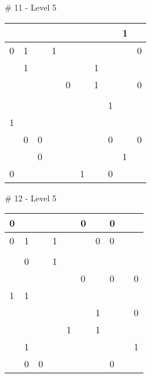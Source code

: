 \medskip

\# 11 - Level 5 \newline
\begin{tabular}{|m{\collen}|m{\collen}|m{\collen}|m{\collen}|m{\collen}|m{\collen}|m{\collen}|m{\collen}|m{\collen}|m{\collen}|}
\hline
    &   &   &   &   &   &   &   & 1 &   \\
\hline
  0 & 1 &   & 1 &   &   &   &   &   & 0 \\
\hline
    & 1 &   &   &   &   & 1 &   &   &   \\
\hline
    &   &   &   & 0 &   & 1 &   &   & 0 \\
\hline
    &   &   &   &   &   &   &   &   &   \\
\hline
    &   &   &   &   &   &   & 1 &   &   \\
\hline
  1 &   &   &   &   &   &   &   &   &   \\
\hline
    & 0 & 0 &   &   &   &   & 0 &   & 0 \\
\hline
    &   & 0 &   &   &   &   &   & 1 &   \\
\hline
  0 &   &   &   &   & 1 &   & 0 &   &   \\
\hline
\end{tabular}


\medskip

\# 12 - Level 5 \newline
\begin{tabular}{|m{\collen}|m{\collen}|m{\collen}|m{\collen}|m{\collen}|m{\collen}|m{\collen}|m{\collen}|m{\collen}|m{\collen}|}
\hline
  0 &   &   &   &   & 0 &   & 0 &   &   \\
\hline
  0 & 1 &   & 1 &   &   & 0 & 0 &   &   \\
\hline
    &   &   &   &   &   &   &   &   &   \\
\hline
    & 0 &   & 1 &   &   &   &   &   &   \\
\hline
    &   &   &   &   & 0 &   & 0 &   & 0 \\
\hline
  1 & 1 &   &   &   &   &   &   &   &   \\
\hline
    &   &   &   &   &   & 1 &   &   & 0 \\
\hline
    &   &   &   & 1 &   & 1 &   &   &   \\
\hline
    & 1 &   &   &   &   &   &   &   & 1 \\
\hline
    & 0 & 0 &   &   &   &   & 0 &   &   \\
\hline
\end{tabular}


\medskip


